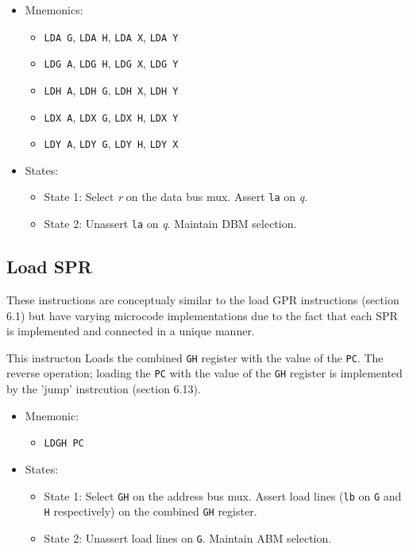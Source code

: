 \documentclass[a4paper,12pt]{article}
\newcommand{\Gr}{\texttt{G}}
\newcommand{\Hr}{\texttt{H}}
\newcommand{\PC}{\texttt{PC}}
\newcommand{\qq}{\textit{q}}
\newcommand\rr{\textit{r}}
\begin{document}
\begin{itemize}
\item Mnemonics:
\begin{itemize}
	\item \texttt{LDA G}, \texttt{LDA H}, \texttt{LDA X}, \texttt{LDA Y}
	\item \texttt{LDG A}, \texttt{LDG H}, \texttt{LDG X}, \texttt{LDG Y}
	\item \texttt{LDH A}, \texttt{LDH G}, \texttt{LDH X}, \texttt{LDH Y}
	\item \texttt{LDX A}, \texttt{LDX G}, \texttt{LDX H}, \texttt{LDX Y}
	\item \texttt{LDY A}, \texttt{LDY G}, \texttt{LDY H}, \texttt{LDY X}
\end{itemize}
\item States:
\begin{itemize}
	\item State 1: Select \rr{} on the data bus mux. Assert \texttt{la} on
	\qq{}.
	\item State 2: Unassert \texttt{la} on \qq{}. Maintain DBM selection.
\end{itemize}
\end{itemize}

\subsection{Load SPR}
These instructions are conceptualy similar to the load GPR instructions
(section 6.1) but have varying microcode implementations due to the fact that
each SPR is implemented and connected in a unique manner.
\par

This instructon Loads the combined \Gr{}\Hr{} register with the value of the 
\PC{}. The reverse operation; loading the \PC{} with the value of the 
\Gr{}\Hr{} register is implemented by the 'jump' instrcution (section 6.13).
\par

\begin{itemize}
\item Mnemonic:
\begin{itemize}
	\item \texttt{LDGH PC}
\end{itemize}
\item States:
\begin{itemize}
	\item State 1: Select \Gr{}\Hr{} on the address bus mux. Assert load
	lines (\texttt{lb} on \Gr{} and \Hr{} respectively) on the combined 
	\Gr{}\Hr{} register.
	\item State 2: Unassert load lines on \Gr{}. Maintain ABM selection.
\end{itemize}
\end{itemize}
\end{document}
